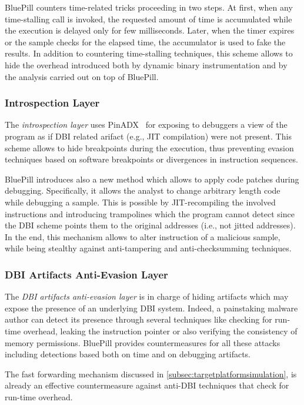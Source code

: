 \documentclass[LaM,binding=0.6cm]{sapthesis}
\begin{document}
BluePill counters time-related tricks proceeding in two steps. At first, when any time-stalling call is invoked, the requested amount of time is accumulated while the execution is delayed only for few milliseconds. Later, when the timer expires or the sample checks for the elapsed time, the accumulator is used to fake the results. In addition to countering time-stalling techniques, this scheme allows to hide the overhead introduced both by dynamic binary instrumentation and by the analysis carried out on top of BluePill.

\subsubsection{Introspection Layer}
The \textit{introspection layer} uses PinADX~\cite{lueck2012pinadx} for exposing to debuggers a view of the program as if DBI related arifact (e.g., JIT compilation) were not present. This scheme allows to hide breakpoints during the execution, thus preventing evasion techniques based on software breakpoints or divergences in instruction sequences.

BluePill introduces also a new method which allows to apply code patches during debugging. Specifically, it allows the analyst to change arbitrary length code while debugging a sample. This is possible by JIT-recompiling the involved instructions and introducing trampolines which the program cannot detect since the DBI scheme points them to the original addresses (i.e., not jitted addresses). In the end, this mechanism allows to alter instruction of a malicious sample, while being stealthy against anti-tampering and anti-checksumming techniques.

\subsubsection{DBI Artifacts Anti-Evasion Layer}
The \textit{DBI artifacts anti-evasion layer} is in charge of hiding artifacts which may expose the presence of an underlying DBI system. Indeed, a painstaking malware author can detect its presence through several techniques like checking for run-time overhead, leaking the instruction pointer or also verifying the consistency of memory permissions. BluePill provides countermeasures for all these attacks including detections based both on time and on debugging artifacts.

The fast forwarding mechanism discussed in \autoref{subsec:targetplatformsimulation}, is already an effective countermeasure against anti-DBI techniques that check for run-time overhead.
\end{document}
